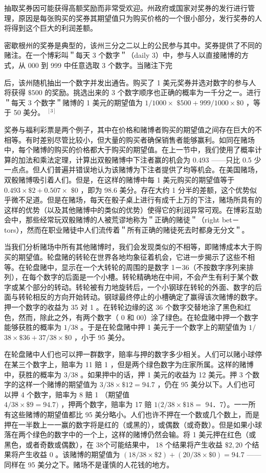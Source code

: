 抽取奖券因可能获得高额奖励而非常受欢迎。州政府或国家对奖券的发行进行管理，原因是每张购买的奖券其期望值只为购买价格的一个很小部分，发行奖券的人将得到这个巨大的利润差额。

密歇根州的奖券是典型的，该州三分之二以上的公民参与其中。奖券提供了不同的赌注。在一个博彩叫＂每天 3 个数字＂（daily 3）中，参与人以直接赌博的方式，从 000 到 999 中任意选取 3 个数字。当赌注下完

后，该州随机抽出一个数字并发出通告。购买了 1 美元奖券并选对数字的参与人将获得 $\$ 500$ 的奖励。挑选出来的 3 个数字顺序也正确的概率为一千分之一。进行＂每天 3 个数字＂赌博的 1 美元的期望值为 $1 / 1000 \times$ $\$ 500+999 / 1000 \times \$ 0$ ，等于 50 美分。 ${ }^{[3]}$

奖券与福利彩票是两个例子，其中在价格和赌博者购买的期望值之间存在巨大的不相等。有时差别尽管比较小，但大量的购买者确保销售者能够赢利。如同在赌场中，每个赌博的购买的价格都大于购买的期望值。在上一节中，我们使用了概率计算的加法和乘法定理，计算出双骰赌博中下注者赢的机会为 0.493 ——只比 0.5 少一点点。但人们普遍并错误地认为该赌博为下注者提供了均等机会。在美国赌场，双骰赌博吸引着人们。但是，在这样的赌博中每 1 美元购买的期望值等于 $0.493 \times \$ 2+0.507 \times$ $\$ 0$ ，即为 98.6 美分。存在大约 1 分半的差额，这个优势似乎微不足道。但是在赌场，每天在骰子桌上进行有成千上万的下注，赌场所具有的这样的优势（以及其他赌博中的类似的优势）使得它的利润异常可观。在博彩互助会中，那些经常玩双骰赌博的人被荒谬地称为＂正确的赌徒＂（right bet－ tors），然而在职业赌徒中人们流传着＂所有正确的赌徒死去时都身无分文＂。

当我们分析赌场中所有其他赌博时，我们会发现类似的不相等，即赌博成本大于购买的期望值。轮盘赌的转轮在世界各地均象征着机会，它进一步揭示了这些不相等。在轮盘赌中，显示在一个大转轮的周围的是数字 1－36（不按数字序列来排列），在每个数字的后面是一个小槽。转轮精确地在中间，不会产生有利于某个数字或某个部分的转动。转轮被有力地旋转后，一个小钢球在转轮的外面、数字的后面与转轮相反的方向开始转动。钢球最终停止的小槽确定了赢得该次赌博的数字。押一个数字的收益为 35 对 1 。在转轮边缘的这 36 个数字交替地涂了黑色和红色，然而，除此之外，有两个数字（ 0 和 00）涂了绿色。在轮盘赌中押一个数字能够获胜的概率为 $1 / 38$ 。于是在轮盘赌中押 1 美元于一个数字上的期望值为 $1 /$ $38 \times \$ 36+37 / 38 \times \$ 0$ ，小于 95 美分。

在轮盘赌中人们也可以押一群数字，赔率与押的数字多少相关。人们可以赌小球停在某三个数字上，赔率为 11 赔 1 ，但是两个绿色数字为庄家所属。这样的赌博中，获胜的概率为 $3 / 38$ 。如果押中的话，押 1 美元的收益为 12 美元。押 3 个数字的这样一个赌博的期望值为 $3 / 38 \times \$ 12=94.7$ ，仍在 95 美分以下。人们也可以押 4 个数字，赔率为 8 赔 1 （期望值\\
$4 / 38 \times \$ 9=94.7)$ ，押两个数字，赔率为 17 赔 $1(2 / 38 \times \$ 18=$ 94．7）。一一所有这些赌博的期望值都比 95 美分略小。人们也许不押在一个数或几个数上，而是押在一半数上一一赢的数字将是红的（或黑的），或偶数（或奇数）。但是如果小球落在两个绿色的数字中的一个上，这样的赌博仍然会输。将 1 美元押在红色（或黑色，或者奇数或偶数），在 38个可能结果中， 18 个结果将产生收益 $\$ 2,20$ 个结果将产生收益 0 。该赌博的期望值为 $(18 / 38 \times \$ 2)+(20 / 38 \times \$ 0)=94.7$ ——同样在 95 美分之下。赌场不是谨慎的人花钱的地方。

